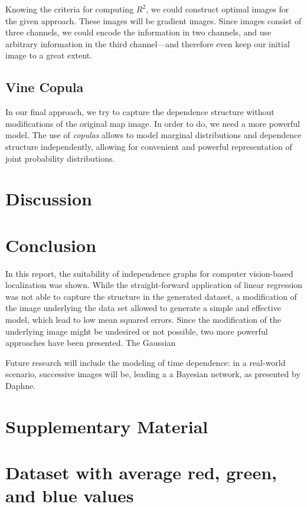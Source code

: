 \documentclass{article}
\begin{document}
Knowing the criteria for computing $R^2$, we could construct optimal
images for the given approach. These images will be gradient
images. Since images consist of three channels, we could encode the
information in two channels, and use arbitrary information in the
third channel---and therefore even keep our initial image to a great
extent.

\subsection{Vine Copula}

In our final approach, we try to capture the dependence structure
without modifications of the original map image. In order to do, we
need a more powerful model. The use of \emph{copulas} allows to model
marginal distributions and dependence structure independently,
allowing for convenient and powerful representation of joint
probability distributions.
                                          
\section{Discussion}



\section{Conclusion}

In this report, the suitability of independence graphs for computer
vision-based localization was shown. While the straight-forward
application of linear regression was not able to capture the structure
in the generated dataset, a modification of the image underlying the
data set allowed to generate a simple and effective model, which lead
to low mean squared errors. Since the
modification of the underlying image might be undesired or not
possible, two more powerful approaches have been presented. The
Gaussian 

Future research will include the modeling of time dependence: in a
real-world scenario, successive images will be, leading a a Bayesian
network, as presented by Daphne.



\appendix

\section{Supplementary Material}

\section{Dataset with average red, green, and blue values}
\begin{center}
\end{center}
\end{document}
